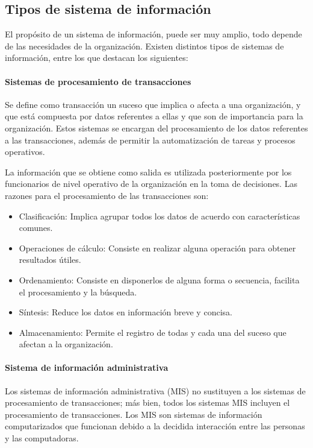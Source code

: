 \subsection{ Tipos de sistema de información}

El propósito de un sistema de información, puede ser muy amplio, todo depende de las necesidades de la organización. Existen distintos tipos de sistemas de información, entre los que destacan los siguientes:

\setcounter{secnumdepth}{3}
\paragraph{Sistemas de procesamiento de transacciones}

Se define como transacción un suceso que implica o afecta a una organización, y que está compuesta por datos referentes a ellas y que son de importancia para la organización. Estos sistemas se encargan del procesamiento de los datos referentes a las transacciones, además de permitir la automatización de tareas y procesos operativos. 

La información que se obtiene como salida es utilizada posteriormente por los funcionarios de nivel operativo de la organización en la toma de decisiones. Las razones para el procesamiento de las transacciones son:  

\begin{itemize}
\item Clasificación: Implica agrupar todos los datos de acuerdo con características comunes.
\item Operaciones de cálculo: Consiste en realizar alguna operación para obtener resultados útiles.  
\item Ordenamiento: Consiste en disponerlos de alguna forma o secuencia, facilita el procesamiento y la búsqueda.  
\item Síntesis: Reduce los datos en información breve y concisa. 
\item Almacenamiento: Permite el registro de todas y cada una del suceso que afectan a la organización.

\end{itemize}

\paragraph{Sistema de información administrativa}

Los sistemas de información administrativa (MIS) no sustituyen a los sistemas de procesamiento de transacciones; más bien, todos los sistemas MIS incluyen el procesamiento de transacciones. Los MIS son sistemas de información computarizados que funcionan debido a la decidida interacción entre las personas y las computadoras.

